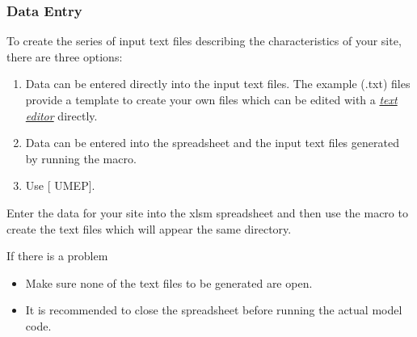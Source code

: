 \documentclass[letterpaper,10pt,english]{sphinxmanual}
\begin{document}
\subsubsection{Data Entry}
\label{\detokenize{prepare-to-run-the-model:data-entry}}
To create the series of input text files describing the characteristics
of your site, there are three options:
\begin{enumerate}
\item {} 
Data can be entered directly into the input text files. The example
(.txt) files provide a template to create your own files which can be
edited with a {\hyperref[\detokenize{prepare-to-run-the-model:A_text_editor}]{\emph{text editor}}} directly.

\item {} 
Data can be entered into the spreadsheet  and
the input text files generated by running the macro.

\item {} 
Use {[}\textbar{} UMEP{]}.

\end{enumerate}

 Enter the data for your site into the xlsm
spreadsheet  and then use the macro to create the
text files which will appear the same directory.

If there is a problem
\begin{itemize}
\item {} 
Make sure none of the text files to be generated are open.

\item {} 
It is recommended to close the spreadsheet before running the actual
model code.

\end{itemize}
\end{document}
